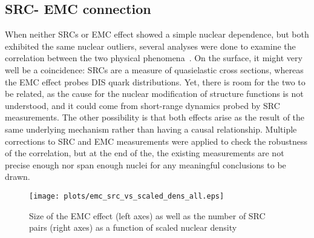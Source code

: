 \subsection{\label{sec:SRC_EMC}SRC- EMC connection}
When neither SRCs or EMC effect showed a simple nuclear dependence, but both exhibited the same nuclear outliers, several analyses were done to examine the correlation between the two physical phenomena~\cite{PhysRevC.86.065204, Hen:2012fm, Weinstein:2010rt}.  On the surface, it might very well be a coincidence: SRCs are a measure of quasielastic cross sections, whereas the EMC effect probes DIS quark distributions.  Yet, there is room for the two to be related, as the cause for the nuclear modification of structure functions is not understood, and it could come from short-range dynamics probed by SRC measurements.   The other possibility is that both effects arise as the result of the same underlying mechanism rather than having a causal relationship.  Multiple corrections to SRC and EMC measurements were applied to check the robustness of the correlation, but at the end of the, the existing measurements are not precise enough nor span enough nuclei for any meaningful conclusions to be drawn.
%
\begin{figure}[htb]
  \texttt{[image: plots/emc\_src\_vs\_scaled\_dens\_all.eps]}
  \caption{Size of the EMC effect (left axes) as well as the number of SRC pairs (right axes) as a function of scaled nuclear density}
  \label{fig:src_emc}
\end{figure}

